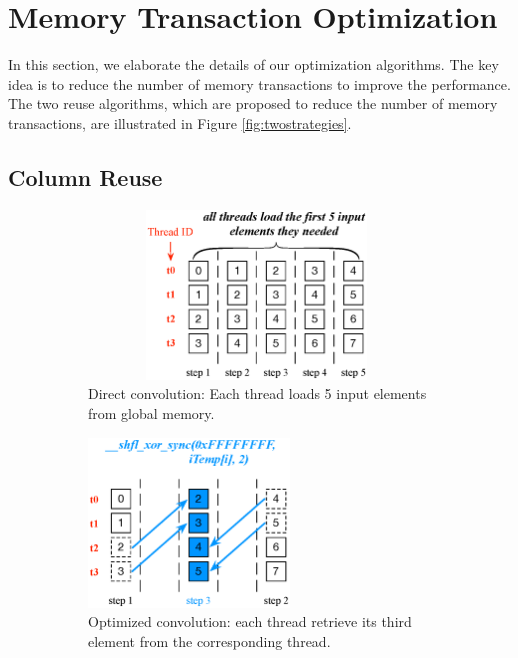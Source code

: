 \section{Memory Transaction Optimization}
\label{sec:strategies} In this section, we elaborate the details of  our optimization algorithms. The key idea is to reduce the  number of memory
transactions to improve the performance. The two reuse algorithms, which are proposed to reduce the number of memory transactions, are illustrated in Figure \ref{fig:twostrategies}.


\subsection{Column Reuse}
\label{sec:creuse}
\begin{figure}
	\begin{subfigure}{0.33\textwidth}
		\centering
		\captionsetup{width=0.9\textwidth}
		 \includegraphics[width=0.98\textwidth,height=4.5cm]{./figure/directconv.eps}
		 \caption{Direct convolution: Each thread loads 5 input elements from global memory.}
		 \label{fig:directalgo}
	\end{subfigure}
	\begin{subfigure}{0.3\textwidth}
		\centering
		\captionsetup{width=0.9\textwidth}
		 \includegraphics[width=\textwidth,height=4.5cm]{./figure/optalgo1.eps}
		 \caption{Optimized convolution: each thread retrieve its third element from the corresponding thread.}
		 \label{fig:optalgo1}
	\end{subfigure}
	\begin{subfigure}{0.3\textwidth}
		\centering
		\captionsetup{width=0.9\textwidth}


\end{subfigure}
\end{figure}
